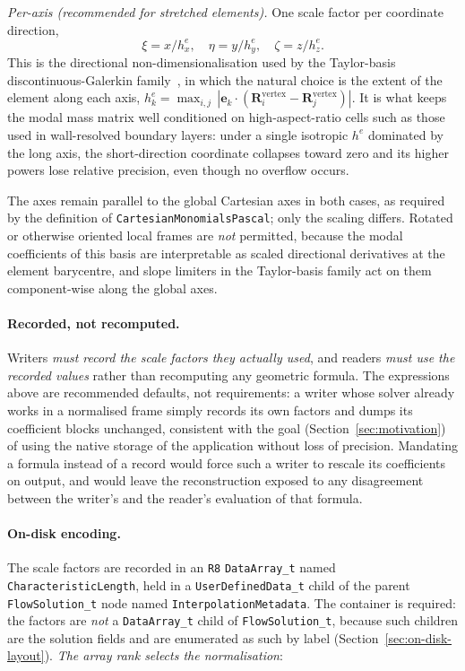 \documentclass[11pt,letterpaper]{article}
\newif\ifvfourdraft
\newcommand{\vfourmark}{\ifvfourdraft\textcolor{v4violet}{\textbf{[v4]}}\ \fi}
\begin{document}
\smallskip\noindent\textit{Per-axis (recommended for stretched elements).}  One scale
factor per coordinate direction,
\begin{equation}
  \xi = x/h^e_x, \quad \eta = y/h^e_y, \quad \zeta = z/h^e_z .
\end{equation}
This is the directional non-dimensionalisation used by the Taylor-basis
discontinuous-Galerkin family~\cite{LuoBaumLohner08,Kuzmin20}, in which the natural
choice is the extent of the element along each axis,
$h^e_k = \max_{i,j}\,|\mathbf{e}_k\cdot(\mathbf{R}_i^\mathrm{vertex}
- \mathbf{R}_j^\mathrm{vertex})|$.
It is what keeps the modal mass matrix well conditioned on high-aspect-ratio cells such
as those used in wall-resolved boundary layers: under a single isotropic $h^e$ dominated
by the long axis, the short-direction coordinate collapses toward zero and its higher
powers lose relative precision, even though no overflow occurs.

\smallskip\noindent The axes remain parallel to the global Cartesian axes in both cases,
as required by the definition of \texttt{CartesianMonomialsPascal}; only the scaling
differs.  Rotated or otherwise oriented local frames are \emph{not} permitted, because
the modal coefficients of this basis are interpretable as scaled directional derivatives
at the element barycentre, and slope limiters in the Taylor-basis family act on them
component-wise along the global axes.

\paragraph{Recorded, not recomputed.}
Writers \emph{must record the scale factors they actually used}, and readers
\emph{must use the recorded values} rather than recomputing any geometric formula.
The expressions above are recommended defaults, not requirements: a writer whose
solver already works in a normalised frame simply records its own factors and dumps
its coefficient blocks unchanged, consistent with the goal (Section~\ref{sec:motivation})
of using the native storage of the application without loss of precision.  Mandating a
formula instead of a record would force such a writer to rescale its coefficients on
output, and would leave the reconstruction exposed to any disagreement between the
writer's and the reader's evaluation of that formula.

\paragraph{On-disk encoding.}
The scale factors are recorded in an \texttt{R8} \texttt{DataArray\_t} named
\texttt{CharacteristicLength}, held in a \texttt{UserDefinedData\_t} child of the
parent \texttt{FlowSolution\_t} node named \texttt{InterpolationMetadata}.
\vfourmark The container is required: the factors are \emph{not} a
\texttt{DataArray\_t} child of \texttt{FlowSolution\_t}, because such children are
the solution fields and are enumerated as such by label
(Section~\ref{sec:on-disk-layout}).  \emph{The array rank selects the
normalisation}:
\end{document}

